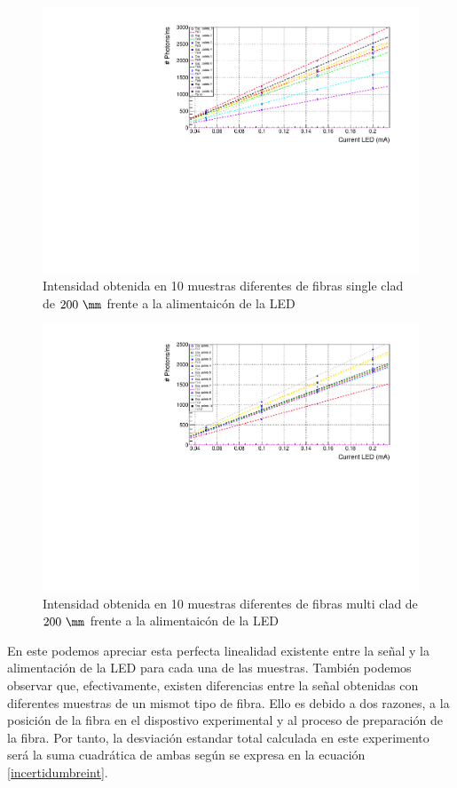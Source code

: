 \begin{figure}[hbtp]
\centering
\includegraphics[scale=0.7]{Figuras/SamplesSingleCladHouda.pdf}
\caption{Intensidad obtenida en 10 muestras diferentes de fibras single clad de $200~\mm$ frente a la alimentaicón de la LED\label{medidassingleclad}}
\end{figure}

\begin{figure}[hbtp]
\centering
\includegraphics[scale=0.7]{Figuras/SamplesMultiClad.pdf}
\caption{Intensidad obtenida en 10 muestras diferentes de fibras multi clad de $200~\mm$ frente a la alimentaicón de la LED\label{medidasmulticlad}}
\end{figure}

En este podemos apreciar esta perfecta linealidad existente entre la señal y la alimentación de la LED para cada una de las muestras. También podemos observar que, efectivamente, existen diferencias entre la señal obtenidas con diferentes muestras de un mismot tipo de fibra. Ello es debido a dos razones, a la posición de la fibra en el dispostivo experimental y al proceso de preparación de la fibra. Por tanto, la desviación estandar total calculada en este experimento será la suma cuadrática de ambas según se expresa en la ecuación \ref{incertidumbreint}.

